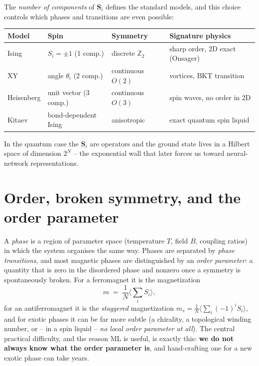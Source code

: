 \documentclass[11pt]{article}
\newcommand{\vS}{\mathbf{S}}
\begin{document}
The \emph{number of components} of $\vS_i$ defines the standard models, and this choice
controls which phases and transitions are even possible:
\begin{center}
\begin{tabular}{@{}llll@{}}
\toprule
Model & Spin & Symmetry & Signature physics \\
\midrule
Ising      & $S_i=\pm1$ (1 comp.)      & discrete $\mathbb{Z}_2$ & sharp order, $2$D exact (Onsager) \\
XY         & angle $\theta_i$ (2 comp.) & continuous $O(2)$       & vortices, BKT transition \\
Heisenberg & unit vector (3 comp.)      & continuous $O(3)$       & spin waves, no order in 2D \\
Kitaev     & bond-dependent Ising       & anisotropic             & exact quantum spin liquid \\
\bottomrule
\end{tabular}
\end{center}

\noindent In the quantum case the $\vS_i$ are operators and the ground state lives in a
Hilbert space of dimension $2^N$ -- the exponential wall that later forces us toward
neural-network representations.

\section{Order, broken symmetry, and the order parameter}
A \emph{phase} is a region of parameter space (temperature $T$, field $B$, coupling
ratios) in which the system organises the same way. Phases are separated by
\emph{phase transitions}, and most magnetic phases are distinguished by an
\emph{order parameter}: a quantity that is zero in the disordered phase and nonzero once
a symmetry is spontaneously broken. For a ferromagnet it is the magnetization
\begin{equation}
m \;=\; \frac{1}{N}\Big\langle \sum_i S_i \Big\rangle ,
\end{equation}
for an antiferromagnet it is the \emph{staggered} magnetization $m_s=\frac1N\langle\sum_i
(-1)^i S_i\rangle$, and for exotic phases it can be far more subtle (a chirality, a
topological winding number, or -- in a spin liquid -- \emph{no local order parameter at
all}). The central practical difficulty, and the reason ML is useful, is exactly this:
\textbf{we do not always know what the order parameter is}, and hand-crafting one for a
new exotic phase can take years.
\end{document}
